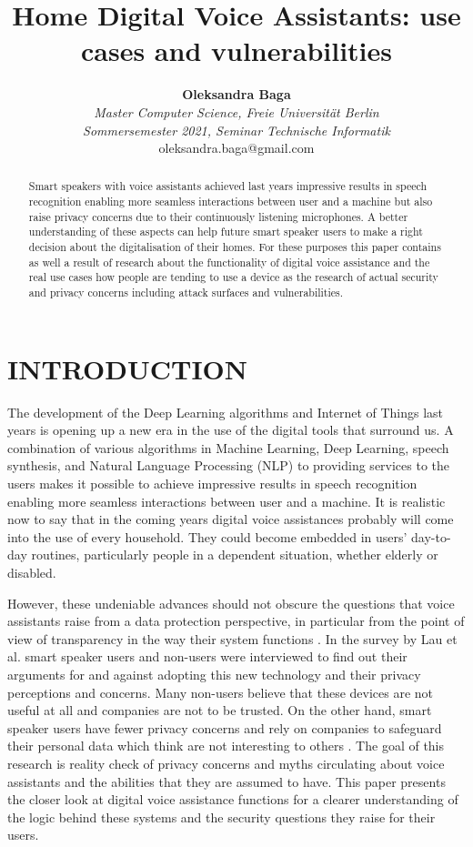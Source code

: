 \documentclass[letterpaper, 10 pt, conference]{ieeeconf}  %
\title{\LARGE \bf
Home Digital Voice Assistants: use cases and vulnerabilities
}
\author{\textbf{Oleksandra Baga}\\ 
\textit{\small Master Computer Science, Freie Universit\"at Berlin}\\ 
\textit{\small Sommersemester 2021, Seminar Technische Informatik}\\
{\small oleksandra.baga@gmail.com}}
\begin{document}
\maketitle

\thispagestyle{empty}
\pagestyle{empty}


\begin{abstract}

Smart speakers with voice assistants achieved last years impressive results in speech recognition enabling more seamless interactions between user and a machine but also raise privacy concerns due to their continuously listening microphones. A better understanding of these aspects can help future smart speaker users to make a right decision about the digitalisation of their homes. For these purposes this paper contains as well a result of research about the functionality of digital voice assistance and the real use cases how people are tending to use a device as the research of actual security and privacy concerns including attack surfaces and vulnerabilities.  
\end{abstract}


\section{INTRODUCTION}
The development of the Deep Learning algorithms and Internet of Things last years is opening up a new era in the use of the digital tools that surround us. A combination of various algorithms in Machine Learning, Deep Learning, speech synthesis, and Natural Language Processing (NLP) to providing services to the users makes it possible to achieve impressive results in speech recognition enabling more seamless interactions between user and a machine. It is realistic now to say that in the coming years digital voice assistances probably will come into the use of every household. They  could  become  embedded  in  users'  day-to-day  routines,  particularly  people  in  a  dependent situation, whether elderly or disabled. 

However, these undeniable advances should not obscure the questions that voice assistants raise from a data protection  perspective,  in  particular  from  the  point  of  view of transparency in the way their system functions \cite{c8}. In the survey by Lau et al. \cite{c5} smart speaker users and non-users were interviewed to find out their arguments for and against adopting this new technology and their privacy perceptions and concerns. Many non-users believe that these devices are not useful at all and companies are not to be trusted. On the other hand, smart speaker users have fewer privacy concerns and rely on companies to safeguard their personal data which think are not interesting to others \cite{c2}. The goal of this research is reality check of privacy concerns and myths circulating about voice assistants and the abilities that they are assumed to have. This paper presents the closer look at digital voice assistance functions for a clearer understanding of the logic behind these systems and the security questions they raise for their users. 
\end{document}
